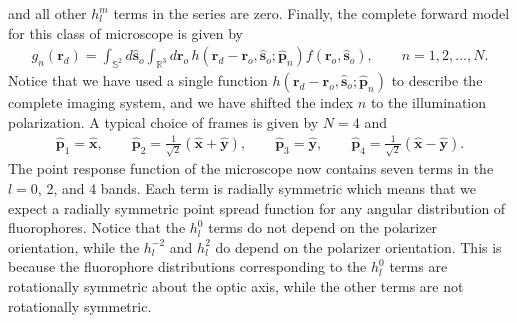 \documentclass[11pt]{article}
\providecommand{\ro}[1]{\mathbf{\mathbf{r}}_o}
\providecommand{\so}[1]{\mathbf{\hat{s}}_o}
\providecommand{\rd}[1]{\mathbf{r}_d}
\providecommand{\mh}[1]{\mathbf{\hat{#1}}}
\providecommand{\mbb}[1]{\mathbb{#1}}
\begin{document}
and all other $h_l^m$ terms in the series are zero. Finally, the complete
forward model for this class of microscope is given by
\begin{align}
    g_n(\rd{}) = \int_{\mbb{S}^2}d\so{}\int_{\mbb{R}^3}d\ro{}\, h(\rd{} - \ro{}, \so{}; \mh{p}_n)f(\ro{}, \so{}),\qquad  n=1, 2,\ldots,N. \label{eq:fwdpolillum}
\end{align}
Notice that we have used a single function $h(\rd{} - \ro{}, \so{}; \mh{p}_n)$
to describe the complete imaging system, and we have shifted the index $n$ to
the illumination polarization. A typical choice of frames is given by $N=4$ and
\begin{align}
  \mh{p}_1 = \mh{x},\hspace{2em}
  \mh{p}_2 = \frac{1}{\sqrt{2}}(\mh{x} + \mh{y}),\hspace{2em}
  \mh{p}_3 = \mh{y},\hspace{2em}
  \mh{p}_4 = \frac{1}{\sqrt{2}}(\mh{x} - \mh{y}). 
\end{align}
\indent The point response function of the microscope now contains seven terms
in the $l=0$, 2, and 4 bands. Each term is radially symmetric which means that
we expect a radially symmetric point spread function for any angular
distribution of fluorophores. Notice that the $h_l^0$ terms do not depend on the
polarizer orientation, while the $h_l^{-2}$ and $h_l^{2}$ do depend on the
polarizer orientation. This is because the fluorophore distributions
corresponding to the $h_l^0$ terms are rotationally symmetric about the optic
axis, while the other terms are not rotationally symmetric.
\end{document}
